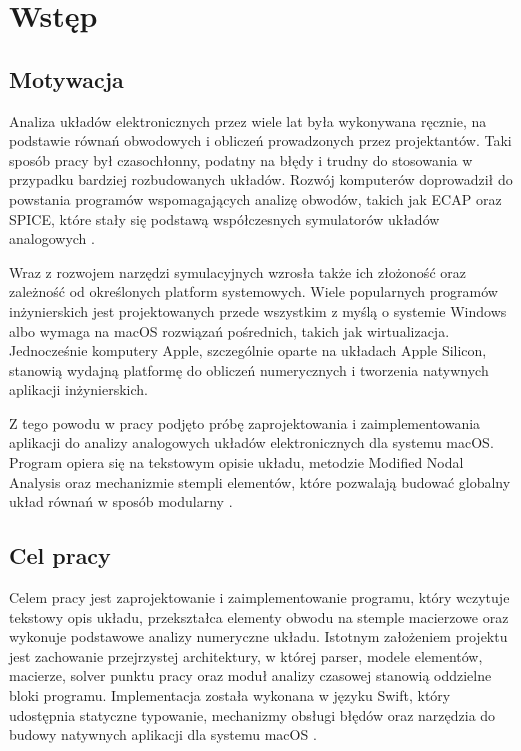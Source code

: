 \chapter{Wstęp}
\label{chap:wstep}

\section{Motywacja}
\label{sec:motywacja}

Analiza układów elektronicznych przez wiele lat była wykonywana ręcznie, na podstawie równań obwodowych i obliczeń prowadzonych przez projektantów. Taki sposób pracy był czasochłonny, podatny na błędy i trudny do stosowania w przypadku bardziej rozbudowanych układów. Rozwój komputerów doprowadził do powstania programów wspomagających analizę obwodów, takich jak ECAP oraz SPICE, które stały się podstawą współczesnych symulatorów układów analogowych \cite{nagel1973spice,nagel1975spice2,kundert1995designer}.

Wraz z rozwojem narzędzi symulacyjnych wzrosła także ich złożoność oraz zależność od określonych platform systemowych. Wiele popularnych programów inżynierskich jest projektowanych przede wszystkim z myślą o systemie Windows albo wymaga na macOS rozwiązań pośrednich, takich jak wirtualizacja. Jednocześnie komputery Apple, szczególnie oparte na układach Apple Silicon, stanowią wydajną platformę do obliczeń numerycznych i tworzenia natywnych aplikacji inżynierskich.

Z tego powodu w pracy podjęto próbę zaprojektowania i zaimplementowania aplikacji do analizy analogowych układów elektronicznych dla systemu macOS. Program opiera się na tekstowym opisie układu, metodzie Modified Nodal Analysis oraz mechanizmie stempli elementów, które pozwalają budować globalny układ równań w sposób modularny \cite{ho1975mna,vlach1994computer}.

\section{Cel pracy}
\label{sec:cel-pracy}

Celem pracy jest zaprojektowanie i zaimplementowanie programu, który wczytuje tekstowy opis układu, przekształca elementy obwodu na stemple macierzowe oraz wykonuje podstawowe analizy numeryczne układu. Istotnym założeniem projektu jest zachowanie przejrzystej architektury, w której parser, modele elementów, macierze, solver punktu pracy oraz moduł analizy czasowej stanowią oddzielne bloki programu. Implementacja została wykonana w języku Swift, który udostępnia statyczne typowanie, mechanizmy obsługi błędów oraz narzędzia do budowy natywnych aplikacji dla systemu macOS \cite{swiftlanguage}.

